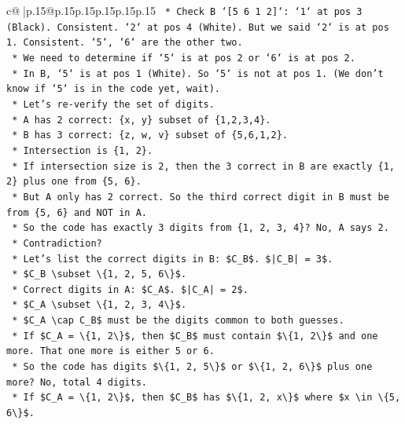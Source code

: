 \documentclass{article}
\begin{document}
{\begin{supertabular}{c@{$\;$}|p{.15\linewidth}@{}p{.15\linewidth}p{.15\linewidth}p{.15\linewidth}p{.15\linewidth}p{.15\linewidth}}
{{{\texttt{        *   Check B `{[}5 6 1 2{]}`: `1` at pos 3 (Black). Consistent. `2` at pos 4 (White). But we said `2` is at pos 1. Consistent. `5`, `6` are the other two.} \\
\texttt{        *   We need to determine if `5` is at pos 2 or `6` is at pos 2.} \\
\texttt{        *   In B, `5` is at pos 1 (White). So `5` is not at pos 1. (We don't know if `5` is in the code yet, wait).} \\
\texttt{        *   Let's re{-}verify the set of digits.} \\
\texttt{        *   A has 2 correct: \{x, y\} subset of \{1,2,3,4\}.} \\
\texttt{        *   B has 3 correct: \{z, w, v\} subset of \{5,6,1,2\}.} \\
\texttt{        *   Intersection is \{1, 2\}.} \\
\texttt{        *   If intersection size is 2, then the 3 correct in B are exactly \{1, 2\} plus one from \{5, 6\}.} \\
\texttt{        *   But A only has 2 correct. So the third correct digit in B must be from \{5, 6\} and NOT in A.} \\
\texttt{        *   So the code has exactly 3 digits from \{1, 2, 3, 4\}? No, A says 2.} \\
\texttt{        *   Contradiction?} \\
\texttt{        *   Let's list the correct digits in B: \$C\_B\$. \$|C\_B| = 3\$.} \\
\texttt{        *   \$C\_B \textbackslash{}subset \textbackslash{}\{1, 2, 5, 6\textbackslash{}\}\$.} \\
\texttt{        *   Correct digits in A: \$C\_A\$. \$|C\_A| = 2\$.} \\
\texttt{        *   \$C\_A \textbackslash{}subset \textbackslash{}\{1, 2, 3, 4\textbackslash{}\}\$.} \\
\texttt{        *   \$C\_A \textbackslash{}cap C\_B\$ must be the digits common to both guesses.} \\
\texttt{        *   If \$C\_A = \textbackslash{}\{1, 2\textbackslash{}\}\$, then \$C\_B\$ must contain \$\textbackslash{}\{1, 2\textbackslash{}\}\$ and one more. That one more is either 5 or 6.} \\
\texttt{        *   So the code has digits \$\textbackslash{}\{1, 2, 5\textbackslash{}\}\$ or \$\textbackslash{}\{1, 2, 6\textbackslash{}\}\$ plus one more? No, total 4 digits.} \\
\texttt{        *   If \$C\_A = \textbackslash{}\{1, 2\textbackslash{}\}\$, then \$C\_B\$ has \$\textbackslash{}\{1, 2, x\textbackslash{}\}\$ where \$x \textbackslash{}in \textbackslash{}\{5, 6\textbackslash{}\}\$.} \\
}}}
\end{supertabular}}
\end{document}
